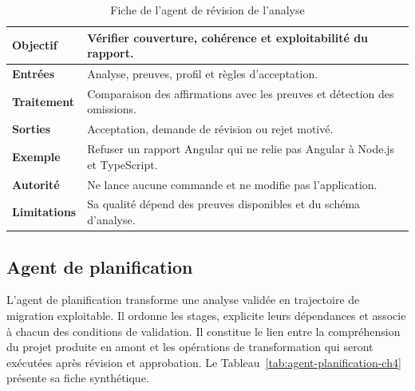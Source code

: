\begin{table}[H]
    \centering
    \caption{Fiche de l'agent de révision de l'analyse}
    \label{tab:agent-review-analyse-ch4}
    \small
    \begin{tabularx}{\textwidth}{|>{\bfseries\RaggedRight\arraybackslash}p{3.1cm}|>{\RaggedRight\arraybackslash}X|}
        \hline
        Objectif & Vérifier couverture, cohérence et exploitabilité du rapport. \\
        \hline
        Entrées & Analyse, preuves, profil et règles d'acceptation. \\
        \hline
        Traitement & Comparaison des affirmations avec les preuves et détection des omissions. \\
        \hline
        Sorties & Acceptation, demande de révision ou rejet motivé. \\
        \hline
        Exemple & Refuser un rapport Angular qui ne relie pas Angular à Node.js et TypeScript. \\
        \hline
        Autorité & Ne lance aucune commande et ne modifie pas l'application. \\
        \hline
        Limitations & Sa qualité dépend des preuves disponibles et du schéma d'analyse. \\
        \hline
    \end{tabularx}
\end{table}

\subsection{Agent de planification}

L'agent de planification transforme une analyse validée en trajectoire de migration exploitable. Il ordonne les stages, explicite leurs dépendances et associe à chacun des conditions de validation. Il constitue le lien entre la compréhension du projet produite en amont et les opérations de transformation qui seront exécutées après révision et approbation. Le Tableau~\ref{tab:agent-planification-ch4} présente sa fiche synthétique.


